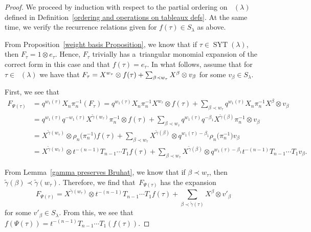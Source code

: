 \documentclass[pdftex]{sigma}
\numberwithin{equation}{section}
\theoremstyle{definition}
\DeclareMathOperator{\SYT}{\mathrm{SYT}}
\DeclareMathOperator{\PSYT}{\mathrm{PSYT}_{\geq 0}}
\begin{document}
\begin{proof}
 We proceed by induction with respect to the partial ordering on $\PSYT(\lambda)$ defined in Definition~\ref{ordering and operations on tableaux defs}. At the same time, we verify the recurrence relations given for $f(\tau) \in S_{\lambda}$ as above.

 From Proposition~\ref{weight basis Proposition}, we know that if $\tau \in \SYT(\lambda)$, then $F_{\tau} = 1\otimes e_{\tau}$. Hence, $F_{\tau}$ trivially has a~triangular monomial expansion of the correct form in this case and that $f(\tau) = e_{\tau}$.
 In what follows, assume that for $\tau \in \PSYT(\lambda)$ we have that
$
 F_{\tau} = X^{w_{\tau}}\otimes f(\tau) + \smash{\sum_{\beta \prec w_{\tau}} X^{\beta}}\otimes v_{\beta}
$
 for some $v_{\beta} \in S_\lambda$.

 First, we see that
 \begin{align*}
 F_{\Psi(\tau)}& = q^{w_1(\tau)}X_n \pi_n^{-1}(F_{\tau}) = q^{w_1(\tau)}X_n \pi_n^{-1}X^{w_{\tau}}\otimes f(\tau) + \sum_{\beta \prec w_{\tau}} q^{w_1(\tau)}X_n \pi_n^{-1}X^{\beta}\otimes v_{\beta} \\
 & = q^{w_1(\tau)}q^{-w_1(\tau)} X^{\widetilde{\gamma}(w_{\tau})} \pi_n^{-1} \otimes f(\tau) + \sum_{\beta \prec w_{\tau}} q^{w_1(\tau)}q^{-\beta_1}X^{\widetilde{\gamma}(\beta)}\pi_n^{-1}\otimes v_{\beta} \\
 & = X^{\widetilde{\gamma}(w_{\tau})} \otimes \rho_n\bigl(\pi_n^{-1}\bigr)f(\tau) + \sum_{\beta \prec w_{\tau}} X^{\widetilde{\gamma}(\beta)} \otimes q^{w_1(\tau)-\beta_1} \rho_n\bigl(\pi_n^{-1}\bigr)v_{\beta} \\
 &= X^{\widetilde{\gamma}(w_{\tau})} \otimes t^{-(n-1)}T_{n-1}\cdots T_1f(\tau) + \sum_{\beta \prec w_{\tau}} X^{\widetilde{\gamma}(\beta)} \otimes q^{w_1(\tau)-\beta_1} t^{-(n-1)}T_{n-1}\cdots T_1v_{\beta}.
 \end{align*}

 From Lemma~\ref{gamma preserves Bruhat}, we know that if $\beta \prec w_{\tau}$, then $\widetilde{\gamma}(\beta) \prec \widetilde{\gamma}(w_{\tau})$. Therefore, we find that~$F_{\Psi(\tau)}$ has the expansion
 \[
 F_{\Psi(\tau)} = X^{\widetilde{\gamma}(w_{\tau})} \otimes t^{-(n-1)}T_{n-1}\cdots T_1f(\tau) + \sum_{\beta \prec \widetilde{\gamma}(\tau)} X^{\beta} \otimes v'_{\beta}
 \]
 for some $v'_{\beta} \in S_{\lambda}$. From this, we see that $f(\Psi(\tau)) = t^{-(n-1)}T_{n-1}\cdots T_1(f(\tau))$.


\end{proof}
\end{document}
